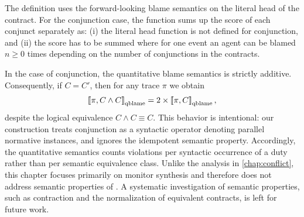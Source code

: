 The definition uses the forward-looking blame semantics on the literal head of the contract. For the conjunction case, the function sums up the score of each conjunct separately as: (i) the literal head function is not defined for conjunction, and (ii) the score has to be summed where for one event an agent can be blamed $n \geq 0$ times depending on the number of conjunctions in the contracts. 

\begin{remark}
  \label{rem:blame-duplication}
  In the case of conjunction, the quantitative blame semantics is strictly additive.
  Consequently, if $C = C'$, then for any trace $\pi$ we obtain
  \[
  \left\llbracket \pi, C \wedge C \right\rrbracket_{\text{qblame}} = 2 \times \left\llbracket \pi, C \right\rrbracket_{\text{qblame}},
  \]
  despite the logical equivalence $C \wedge C \equiv C$.
  This behavior is intentional: our construction treats conjunction as a syntactic operator denoting parallel normative instances, and ignores the idempotent semantic property.
  Accordingly, the quantitative semantics counts violations per syntactic occurrence of a duty rather than per semantic equivalence class.
  Unlike the analysis in \ref{chap:conflict}, this chapter focuses primarily on monitor synthesis and therefore does not address semantic properties of \cDL.
  A systematic investigation of semantic properties, such as contraction and the normalization of equivalent contracts, is left for future work.
\end{remark}


